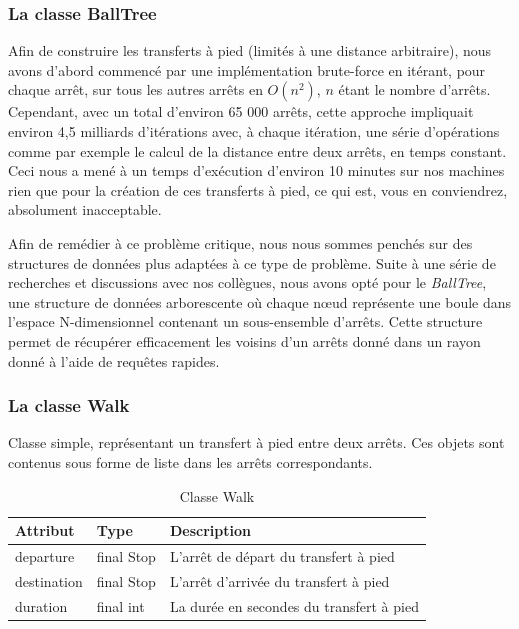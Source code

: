 \documentclass[12pt]{article}
\begin{document}
\subsubsection{La classe BallTree}
\label{sec:balltree}
Afin de construire les transferts à pied (limités à une distance arbitraire), nous avons d'abord commencé par une implémentation brute-force en itérant, pour chaque arrêt, sur tous les
autres arrêts en $O(n^2)$, $n$ étant le nombre d'arrêts. Cependant, avec un total d'environ 65 000 arrêts, cette approche impliquait environ 4,5 milliards d'itérations avec, à chaque 
itération, une série d'opérations comme par exemple le calcul de la distance entre deux arrêts, en temps constant. Ceci nous a mené à un temps d'exécution d'environ 10 minutes sur nos 
machines rien que pour la création de ces transferts à pied, ce qui est, vous en conviendrez, absolument inacceptable.

Afin de remédier à ce problème critique, nous nous sommes penchés sur des structures de données plus adaptées à ce type de problème. Suite à une série de recherches et discussions avec
nos collègues, nous avons opté pour le \emph{BallTree}, une structure de données arborescente où chaque nœud représente une boule dans l'espace N-dimensionnel contenant un sous-ensemble d'arrêts.
Cette structure permet de récupérer efficacement les voisins d'un arrêts donné dans un rayon donné à l'aide de requêtes rapides.

\subsubsection{La classe Walk}
\label{sec:walk}
Classe simple, représentant un transfert à pied entre deux arrêts. Ces objets sont contenus sous forme de liste dans les arrêts correspondants.

\begin{table}[h]
    \centering
    \begin{tabular}{|l|l|p{8cm}|}
    \hline
    \textbf{Attribut} & \textbf{Type} & \textbf{Description} \\
    \hline
    departure & final Stop & L'arrêt de départ du transfert à pied \\
    destination & final Stop & L'arrêt d'arrivée du transfert à pied \\
    duration & final int & La durée en secondes du transfert à pied \\
    \hline
    \end{tabular}
    \caption{Classe Walk}
\end{table}
\end{document}
